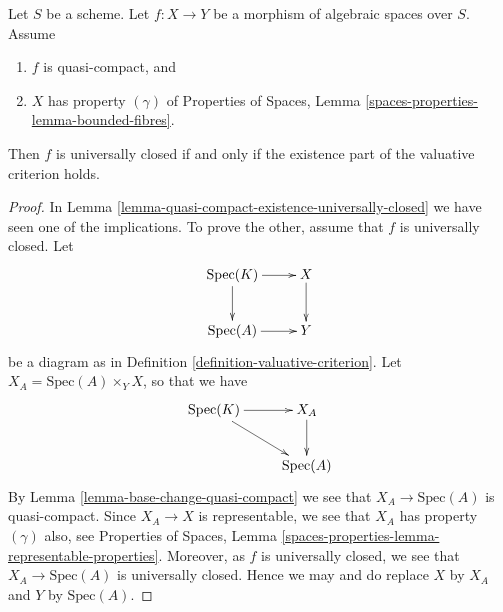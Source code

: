 \begin{proposition}
\label{proposition-characterize-universally-closed}
Let $S$ be a scheme.
Let $f : X \to Y$ be a morphism of algebraic spaces over $S$.
Assume
\begin{enumerate}
\item $f$ is quasi-compact, and
\item $X$ has property $(\gamma)$ of
Properties of Spaces, Lemma \ref{spaces-properties-lemma-bounded-fibres}.
\end{enumerate}
Then $f$ is universally closed if and only if the
existence part of the valuative criterion holds.
\end{proposition}

\begin{proof}
In Lemma \ref{lemma-quasi-compact-existence-universally-closed}
we have seen one of the implications.
To prove the other, assume that $f$ is universally closed. Let
$$
\xymatrix{
\text{Spec}(K) \ar[r] \ar[d] & X \ar[d] \\
\text{Spec}(A) \ar[r] & Y
}
$$
be a diagram as in
Definition \ref{definition-valuative-criterion}.
Let $X_A = \text{Spec}(A) \times_Y X$, so that we have
$$
\xymatrix{
\text{Spec}(K) \ar[r] \ar[rd] & X_A \ar[d] \\
 & \text{Spec}(A)
}
$$
By Lemma \ref{lemma-base-change-quasi-compact} we see that
$X_A \to \text{Spec}(A)$ is quasi-compact. Since $X_A \to X$
is representable, we see that $X_A$ has property $(\gamma)$ also, see
Properties of Spaces,
Lemma \ref{spaces-properties-lemma-representable-properties}.
Moreover, as $f$ is universally closed, we see that $X_A \to \text{Spec}(A)$
is universally closed.
Hence we may and do replace $X$ by $X_A$ and $Y$ by $\text{Spec}(A)$.


\end{proof}
